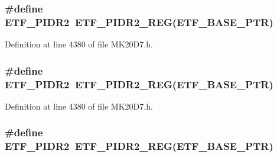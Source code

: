 \subsubsection[{\texorpdfstring{E\+T\+F\+\_\+\+P\+I\+D\+R2}{ETF_PIDR2}}]{\setlength{\rightskip}{0pt plus 5cm}\#define E\+T\+F\+\_\+\+P\+I\+D\+R2~{\bf E\+T\+F\+\_\+\+P\+I\+D\+R2\+\_\+\+R\+EG}({\bf E\+T\+F\+\_\+\+B\+A\+S\+E\+\_\+\+P\+TR})}\hypertarget{group___e_t_f___register___accessor___macros_ga0f092f910c46a57923e2c62fc80e10af}{}\label{group___e_t_f___register___accessor___macros_ga0f092f910c46a57923e2c62fc80e10af}


Definition at line 4380 of file M\+K20\+D7.\+h.

\subsubsection[{\texorpdfstring{E\+T\+F\+\_\+\+P\+I\+D\+R2}{ETF_PIDR2}}]{\setlength{\rightskip}{0pt plus 5cm}\#define E\+T\+F\+\_\+\+P\+I\+D\+R2~{\bf E\+T\+F\+\_\+\+P\+I\+D\+R2\+\_\+\+R\+EG}({\bf E\+T\+F\+\_\+\+B\+A\+S\+E\+\_\+\+P\+TR})}\hypertarget{group___e_t_f___register___accessor___macros_ga0f092f910c46a57923e2c62fc80e10af}{}\label{group___e_t_f___register___accessor___macros_ga0f092f910c46a57923e2c62fc80e10af}


Definition at line 4380 of file M\+K20\+D7.\+h.

\subsubsection[{\texorpdfstring{E\+T\+F\+\_\+\+P\+I\+D\+R2}{ETF_PIDR2}}]{\setlength{\rightskip}{0pt plus 5cm}\#define E\+T\+F\+\_\+\+P\+I\+D\+R2~{\bf E\+T\+F\+\_\+\+P\+I\+D\+R2\+\_\+\+R\+EG}({\bf E\+T\+F\+\_\+\+B\+A\+S\+E\+\_\+\+P\+TR})}\hypertarget{group___e_t_f___register___accessor___macros_ga0f092f910c46a57923e2c62fc80e10af}{}\label{group___e_t_f___register___accessor___macros_ga0f092f910c46a57923e2c62fc80e10af}


